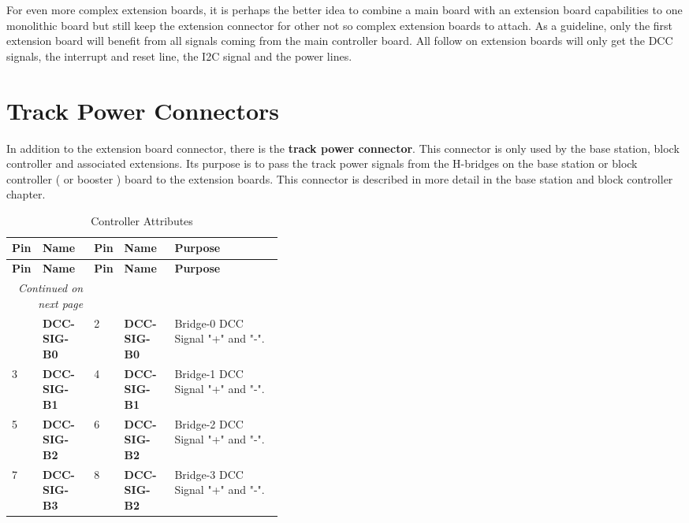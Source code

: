 For even more complex extension boards, it is perhaps the better idea to combine a main board with an extension board capabilities to one monolithic board but still keep the extension connector for other not so complex extension boards to attach. As a guideline, only the first extension board will benefit from all signals coming from the main controller board. All follow on extension boards will only get the DCC signals, the interrupt and reset line, the I2C signal and the power lines.

\section{Track Power Connectors}

In addition to the extension board connector, there is the \textbf{track power connector}. This connector is only used by the base station, block controller and associated extensions. Its purpose is to pass the track power signals from the H-bridges on the base station or block controller ( or booster ) board to the extension boards. This connector is described in more detail in the base station and block controller chapter.

\begin{longtable}{@{}|l|l|l|l|p{0.4\linewidth}@{}}
    \caption{Controller Attributes} \\
    \toprule
    \textbf{Pin} & \textbf{Name} & \textbf{Pin} & \textbf{Name}& \textbf{Purpose}\\
    \midrule
    \endfirsthead
    \toprule
    \textbf{Pin} & \textbf{Name} & \textbf{Pin} & \textbf{Name}& \textbf{Purpose}\\
    \midrule
    \endhead
    \midrule
    \multicolumn{2}{r}{\textit{Continued on next page}} \\
    \midrule
    \endfoot
    \bottomrule
    \endlastfoot
    1 & \textbf{DCC-SIG-B0} & 2 & \textbf{DCC-SIG-B0} & Bridge-0 DCC Signal "+" and "-". \\
    \midrule
    3 & \textbf{DCC-SIG-B1} & 4 & \textbf{DCC-SIG-B1} & Bridge-1 DCC Signal "+" and "-". \\
    \midrule
    5 & \textbf{DCC-SIG-B2} & 6 & \textbf{DCC-SIG-B2} & Bridge-2 DCC Signal "+" and "-". \\
    \midrule
    7 & \textbf{DCC-SIG-B3} & 8 & \textbf{DCC-SIG-B2} & Bridge-3 DCC Signal "+" and "-". \\
    \midrule
\end{longtable} 

\FloatBarrier

